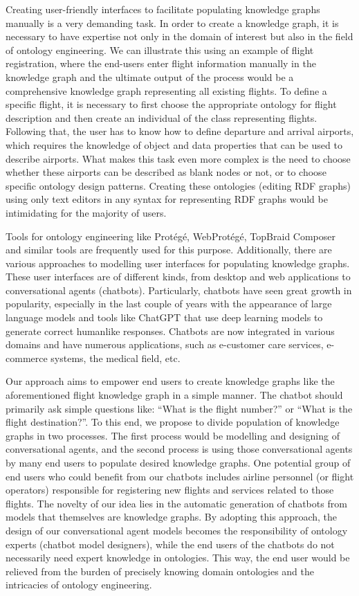 \documentclass[runningheads]{llncs}
\begin{document}
Creating user-friendly interfaces to facilitate populating knowledge graphs manually is a very demanding task. In order to create a knowledge graph, it is necessary to have expertise not only in the domain of interest but also in the field of ontology engineering. We can illustrate this using an example of flight registration, where the end-users enter flight information manually in the knowledge graph and the ultimate output of the process would be a comprehensive knowledge graph representing all existing flights. To define a specific flight, it is necessary to first choose the appropriate ontology for flight description and then create an individual of the class representing flights. Following that, the user has to know how to define departure and arrival airports, which requires the knowledge of object and data properties that can be used to describe airports. What makes this task even more complex is the need to choose whether these airports can be described as blank nodes or not, or to choose specific ontology design patterns. Creating these ontologies (editing RDF graphs) using only text editors in any syntax for representing RDF graphs would be intimidating for the majority of users.

Tools for ontology engineering like Protégé, WebProtégé, TopBraid Composer and similar tools are frequently used for this purpose. Additionally, there are various approaches to modelling user interfaces for populating knowledge graphs. These user interfaces are of different kinds, from desktop and web applications to conversational agents (chatbots). Particularly, chatbots have seen great growth in popularity, especially in the last couple of years with the appearance of large language models and tools like ChatGPT that use deep learning models to generate correct humanlike responses. Chatbots are now integrated in various domains and have numerous applications, such as e-customer care services, e-commerce systems, the medical field, etc.

Our approach aims to empower end users to create knowledge graphs like the aforementioned flight knowledge graph in a simple manner. The chatbot should primarily ask simple questions like: ``What is the flight number?'' or ``What is the flight destination?''. To this end, we propose to divide population of knowledge graphs in two processes. The first process would be modelling and designing of conversational agents, and the second process is using those conversational agents by many end users to populate desired knowledge graphs. One potential group of end users who could benefit from our chatbots includes airline personnel (or flight operators) responsible for registering new flights and services related to those flights. The novelty of our idea lies in the automatic generation of chatbots from models that themselves are knowledge graphs. By adopting this approach, the design of our conversational agent models becomes the responsibility of ontology experts (chatbot model designers),  while the end users of the chatbots do not necessarily need expert knowledge in ontologies. This way, the end user would be relieved from the burden of precisely knowing domain ontologies and the intricacies of ontology engineering.
\end{document}
